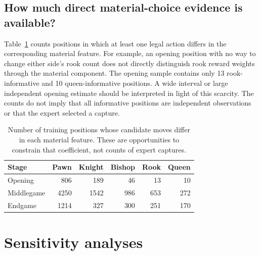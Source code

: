\documentclass[11pt]{article}
\begin{document}
\subsection{How much direct material-choice evidence is available?}
Table~\ref{tab:support} counts positions in which at least one legal action differs in the corresponding material feature. For example, an opening position with no way to change either side's rook count does not directly distinguish rook reward weights through the material component. The opening sample contains only 13 rook-informative and 10 queen-informative positions. A wide interval or large independent opening estimate should be interpreted in light of this scarcity. The counts do not imply that all informative positions are independent observations or that the expert selected a capture.
\begin{table}[htbp]\centering
\small
\caption{Number of training positions whose candidate moves differ in each material feature. These are opportunities to constrain that coefficient, not counts of expert captures.}\label{tab:support}
\begin{tabular}{lrrrrr}
\toprule
Stage & Pawn & Knight & Bishop & Rook & Queen\\\midrule
Opening & 806 & 189 & 46 & 13 & 10\\
Middlegame & 4250 & 1542 & 986 & 653 & 272\\
Endgame & 1214 & 327 & 300 & 251 & 170\\
\bottomrule\end{tabular}\end{table}

\FloatBarrier
\section{Sensitivity analyses}
\end{document}

